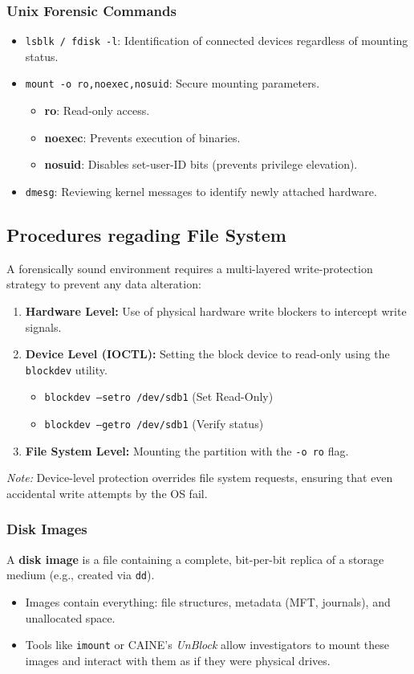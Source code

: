 \subsubsection{Unix Forensic Commands}
\begin{itemize}
    \item \texttt{lsblk / fdisk -l}: Identification of connected devices regardless of mounting status.
    \item \texttt{mount -o ro,noexec,nosuid}: Secure mounting parameters.
    \begin{itemize}
        \item \textbf{ro}: Read-only access.
        \item \textbf{noexec}: Prevents execution of binaries.
        \item \textbf{nosuid}: Disables set-user-ID bits (prevents privilege elevation).
    \end{itemize}
    \item \texttt{dmesg}: Reviewing kernel messages to identify newly attached hardware.
\end{itemize}


\subsection{Procedures regading File System }

A forensically sound environment requires a multi-layered write-protection strategy to prevent any data alteration:
\begin{enumerate}
    \item \textbf{Hardware Level:} Use of physical hardware write blockers to intercept write signals.
    \item \textbf{Device Level (IOCTL):} Setting the block device to read-only using the \texttt{blockdev} utility.
    \begin{itemize}
        \item \texttt{blockdev --setro /dev/sdb1} (Set Read-Only)
        \item \texttt{blockdev --getro /dev/sdb1} (Verify status)
    \end{itemize}
    \item \textbf{File System Level:} Mounting the partition with the \texttt{-o ro} flag.
\end{enumerate}
\textit{ Note:} Device-level protection overrides file system requests, ensuring that even accidental write attempts by the OS fail.

\subsubsection{Disk Images}
A \textbf{disk image} is a file containing a complete, bit-per-bit replica of a storage medium (e.g., created via \texttt{dd}).
\begin{itemize}
    \item Images contain everything: file structures, metadata (MFT, journals), and unallocated space.
    \item Tools like \texttt{imount} or CAINE's \textit{UnBlock} allow investigators to mount these images and interact with them as if they were physical drives.
\end{itemize}


